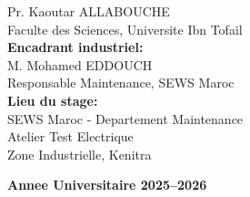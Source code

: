 \begin{titlepage}
\begin{flushleft}
\hspace{2cm}Pr. Kaoutar ALLABOUCHE\\
\hspace{2cm}Faculte des Sciences, Universite Ibn Tofail\\[0.4cm]
\hspace{1cm}\textbf{Encadrant industriel:}\\
\hspace{2cm}M. Mohamed EDDOUCH\\
\hspace{2cm}Responsable Maintenance, SEWS Maroc\\[0.8cm]
{\large\bfseries Lieu du stage:}\\[0.2cm]
\hspace{1cm}SEWS Maroc - Departement Maintenance\\
\hspace{1cm}Atelier Test Electrique\\
\hspace{1cm}Zone Industrielle, Kenitra\\[0.4cm]
\end{flushleft}
\vfill
{\Large\bfseries Annee Universitaire 2025--2026}
\end{titlepage}
\thispagestyle{empty}
\cleardoublepage
